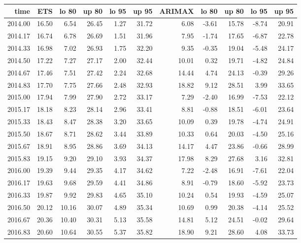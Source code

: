 \documentclass[10pt,a4paper]{article}\usepackage[]{graphicx}\usepackage[]{color}
\begin{document}
\begin{table}[ht]
\centering
\begin{tabular}{rrrrrrrrrrr}
  \hline
time & ETS  & lo 80 & up 80 & lo 95 & up 95 & ARIMAX  & lo 80 & up 80 & lo 95 & up 95 \\ 
  \hline
2014.00 & 16.50 & 6.54 & 26.45 & 1.27 & 31.72 & 6.08 & -3.61 & 15.78 & -8.74 & 20.91 \\ 
  2014.17 & 16.74 & 6.78 & 26.69 & 1.51 & 31.96 & 7.95 & -1.74 & 17.65 & -6.87 & 22.78 \\ 
  2014.33 & 16.98 & 7.02 & 26.93 & 1.75 & 32.20 & 9.35 & -0.35 & 19.04 & -5.48 & 24.17 \\ 
  2014.50 & 17.22 & 7.27 & 27.17 & 2.00 & 32.44 & 10.01 & 0.32 & 19.71 & -4.82 & 24.84 \\ 
  2014.67 & 17.46 & 7.51 & 27.42 & 2.24 & 32.68 & 14.44 & 4.74 & 24.13 & -0.39 & 29.26 \\ 
  2014.83 & 17.70 & 7.75 & 27.66 & 2.48 & 32.93 & 18.82 & 9.12 & 28.51 & 3.99 & 33.65 \\ 
  2015.00 & 17.94 & 7.99 & 27.90 & 2.72 & 33.17 & 7.29 & -2.40 & 16.99 & -7.53 & 22.12 \\ 
  2015.17 & 18.18 & 8.23 & 28.14 & 2.96 & 33.41 & 8.81 & -0.88 & 18.51 & -6.01 & 23.64 \\ 
  2015.33 & 18.43 & 8.47 & 28.38 & 3.20 & 33.65 & 10.09 & 0.39 & 19.78 & -4.74 & 24.91 \\ 
  2015.50 & 18.67 & 8.71 & 28.62 & 3.44 & 33.89 & 10.33 & 0.64 & 20.03 & -4.50 & 25.16 \\ 
  2015.67 & 18.91 & 8.95 & 28.86 & 3.69 & 34.13 & 14.17 & 4.47 & 23.86 & -0.66 & 28.99 \\ 
  2015.83 & 19.15 & 9.20 & 29.10 & 3.93 & 34.37 & 17.98 & 8.29 & 27.68 & 3.16 & 32.81 \\ 
  2016.00 & 19.39 & 9.44 & 29.35 & 4.17 & 34.62 & 7.22 & -2.48 & 16.91 & -7.61 & 22.04 \\ 
  2016.17 & 19.63 & 9.68 & 29.59 & 4.41 & 34.86 & 8.91 & -0.79 & 18.60 & -5.92 & 23.73 \\ 
  2016.33 & 19.87 & 9.92 & 29.83 & 4.65 & 35.10 & 10.24 & 0.54 & 19.93 & -4.59 & 25.07 \\ 
  2016.50 & 20.12 & 10.16 & 30.07 & 4.89 & 35.34 & 10.69 & 0.99 & 20.38 & -4.14 & 25.52 \\ 
  2016.67 & 20.36 & 10.40 & 30.31 & 5.13 & 35.58 & 14.81 & 5.12 & 24.51 & -0.02 & 29.64 \\ 
  2016.83 & 20.60 & 10.64 & 30.55 & 5.37 & 35.82 & 18.90 & 9.21 & 28.60 & 4.08 & 33.73 \\ 

\end{tabular}
\end{table}
\end{document}
